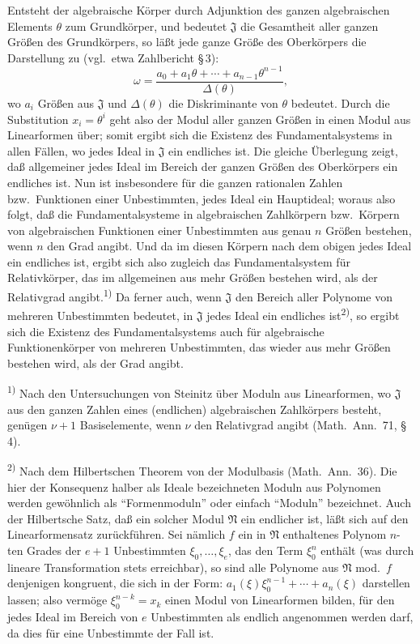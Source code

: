 \documentclass[12pt,a4paper]{article}
\begin{document}
Entsteht der algebraische K\"orper durch Adjunktion des ganzen algebraischen Elements $\theta$ zum Grundk\"orper, und bedeutet $\mathfrak{J}$ die Gesamtheit aller ganzen Gr\"o\ss{}en des Grundk\"orpers, so l\"a\ss{}t jede ganze Gr\"o\ss{}e des Oberk\"orpers die Darstellung zu (vgl.\ etwa Zahlbericht \S\,3):
\[
\omega=\frac{a_{0}+a_{1}\theta+\cdots+a_{n-1}\theta^{n-1}}{\varDelta(\theta)},
\]
wo $a_{i}$ Gr\"o\ss{}en aus $\mathfrak{J}$ und $\varDelta(\theta)$ die Diskriminante von $\theta$ bedeutet. Durch die Substitution $x_{i}=\theta^{i}$ geht also der Modul aller ganzen Gr\"o\ss{}en in einen Modul aus Linearformen \"uber; somit ergibt sich die Existenz des Fundamentalsystems in allen F\"allen, wo jedes Ideal in $\mathfrak{J}$ ein endliches ist. Die gleiche \"Uberlegung zeigt, da\ss{} allgemeiner jedes Ideal im Bereich der ganzen Gr\"o\ss{}en des Oberk\"orpers ein endliches ist. Nun ist insbesondere f\"ur die ganzen rationalen Zahlen bzw.\ Funktionen einer Unbestimmten, jedes Ideal ein Hauptideal; woraus also folgt, da\ss{} die Fundamentalsysteme in algebraischen Zahlk\"orpern bzw.\ K\"orpern von algebraischen Funktionen einer Unbestimmten aus genau $n$ Gr\"o\ss{}en bestehen, wenn $n$ den Grad angibt. Und da im diesen K\"orpern nach dem obigen jedes Ideal ein endliches ist, ergibt sich also zugleich das Fundamentalsystem f\"ur Relativk\"orper, das im allgemeinen aus mehr Gr\"o\ss{}en bestehen wird, als der Relativgrad angibt.\textsuperscript{1)} Da ferner auch, wenn $\mathfrak{J}$ den Bereich aller Polynome von mehreren Unbestimmten bedeutet, in $\mathfrak{J}$ jedes Ideal ein endliches ist\textsuperscript{2)}, so ergibt sich die Existenz des Fundamentalsystems auch f\"ur algebraische Funktionenk\"orper von mehreren Unbestimmten, das wieder aus mehr Gr\"o\ss{}en bestehen wird, als der Grad angibt.

\smallskip
\noindent\textsuperscript{1)} Nach den Untersuchungen von Steinitz \"uber Moduln aus Linearformen, wo $\mathfrak{J}$ aus den ganzen Zahlen eines (endlichen) algebraischen Zahlk\"orpers besteht, gen\"ugen $\nu+1$ Basiselemente, wenn $\nu$ den Relativgrad angibt (Math.\ Ann.\ 71, \S\,4).

\smallskip
\noindent\textsuperscript{2)} Nach dem Hilbertschen Theorem von der Modulbasis (Math.\ Ann.\ 36). Die hier der Konsequenz halber als Ideale bezeichneten Moduln aus Polynomen werden gew\"ohnlich als ``Formenmoduln'' oder einfach ``Moduln'' bezeichnet. Auch der Hilbertsche Satz, da\ss{} ein solcher Modul $\mathfrak{N}$ ein endlicher ist, l\"a\ss{}t sich auf den Linearformensatz zur\"uckf\"uhren. Sei n\"amlich $f$ ein in $\mathfrak{N}$ enthaltenes Polynom $n$-ten Grades der $e+1$ Unbestimmten $\xi_{0},\ldots,\xi_{e}$, das den Term $\xi_{0}^{n}$ enth\"alt (was durch lineare Transformation stets erreichbar), so sind alle Polynome aus $\mathfrak{N}$ mod.\ $f$ denjenigen kongruent, die sich in der Form: $a_{1}(\xi)\xi_{0}^{n-1}+\cdots+a_{n}(\xi)$ darstellen lassen; also verm\"oge $\xi_{0}^{n-k}=x_{k}$ einen Modul von Linearformen bilden, f\"ur den jedes Ideal im Bereich von $e$ Unbestimmten als endlich angenommen werden darf, da dies f\"ur eine Unbestimmte der Fall ist.
\end{document}
